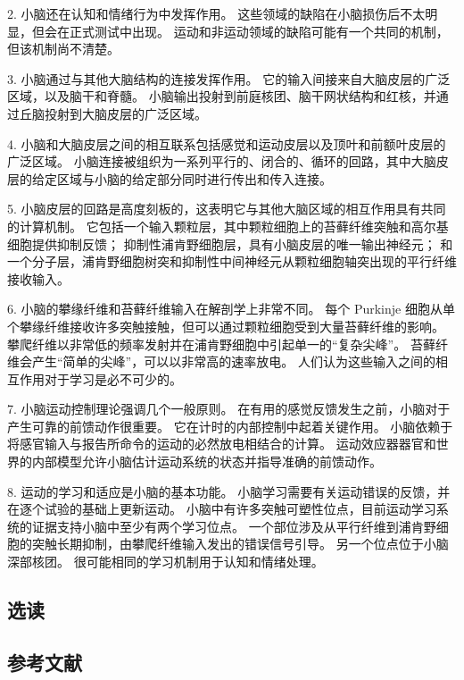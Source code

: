 2. 小脑还在认知和情绪行为中发挥作用。 这些领域的缺陷在小脑损伤后不太明显，但会在正式测试中出现。 运动和非运动领域的缺陷可能有一个共同的机制，但该机制尚不清楚。

3. 小脑通过与其他大脑结构的连接发挥作用。 它的输入间接来自大脑皮层的广泛区域，以及脑干和脊髓。 小脑输出投射到前庭核团、脑干网状结构和红核，并通过丘脑投射到大脑皮层的广泛区域。

4. 小脑和大脑皮层之间的相互联系包括感觉和运动皮层以及顶叶和前额叶皮层的广泛区域。 小脑连接被组织为一系列平行的、闭合的、循环的回路，其中大脑皮层的给定区域与小脑的给定部分同时进行传出和传入连接。

5. 小脑皮层的回路是高度刻板的，这表明它与其他大脑区域的相互作用具有共同的计算机制。 它包括一个输入颗粒层，其中颗粒细胞上的苔藓纤维突触和高尔基细胞提供抑制反馈； 抑制性浦肯野细胞层，具有小脑皮层的唯一输出神经元； 和一个分子层，浦肯野细胞树突和抑制性中间神经元从颗粒细胞轴突出现的平行纤维接收输入。

6. 小脑的攀缘纤维和苔藓纤维输入在解剖学上非常不同。 每个 Purkinje 细胞从单个攀缘纤维接收许多突触接触，但可以通过颗粒细胞受到大量苔藓纤维的影响。 攀爬纤维以非常低的频率发射并在浦肯野细胞中引起单一的“复杂尖峰”。 苔藓纤维会产生“简单的尖峰”，可以以非常高的速率放电。 人们认为这些输入之间的相互作用对于学习是必不可少的。

7. 小脑运动控制理论强调几个一般原则。 在有用的感觉反馈发生之前，小脑对于产生可靠的前馈动作很重要。 它在计时的内部控制中起着关键作用。 小脑依赖于将感官输入与报告所命令的运动的必然放电相结合的计算。 运动效应器器官和世界的内部模型允许小脑估计运动系统的状态并指导准确的前馈动作。

8. 运动的学习和适应是小脑的基本功能。 小脑学习需要有关运动错误的反馈，并在逐个试验的基础上更新运动。 小脑中有许多突触可塑性位点，目前运动学习系统的证据支持小脑中至少有两个学习位点。 一个部位涉及从平行纤维到浦肯野细胞的突触长期抑制，由攀爬纤维输入发出的错误信号引导。 另一个位点位于小脑深部核团。 很可能相同的学习机制用于认知和情绪处理。

\subsection{选读}
\subsection{参考文献}

